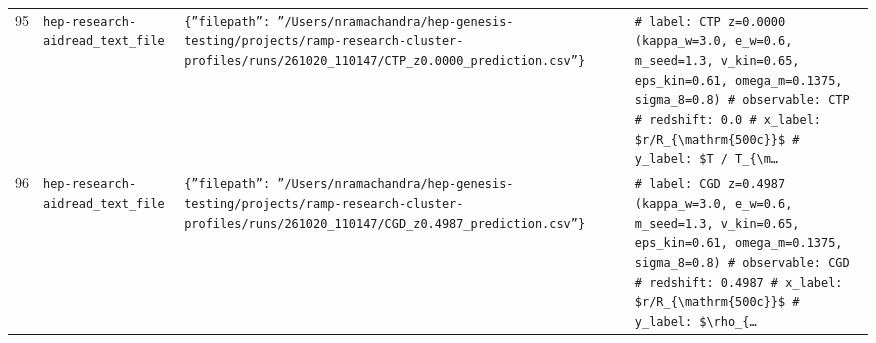 \documentclass[11pt,a4paper]{article}
\begin{document}
\begin{longtable}{@{}p{}p{}p{}p{}@{}}
95 & \texttt{hep-research-aid}\newline\texttt{read\_\allowbreak{}text\_\allowbreak{}file} & \texttt{\{''filepath'':\allowbreak{} ''/\allowbreak{}Users/\allowbreak{}nramachandra/\allowbreak{}hep-genesis-testing/\allowbreak{}projects/\allowbreak{}ramp-research-cluster-profiles/\allowbreak{}runs/\allowbreak{}261020\_\allowbreak{}110147/\allowbreak{}CTP\_\allowbreak{}z0.0000\_\allowbreak{}prediction.csv''\}\allowbreak{}} & \texttt{\# label:\allowbreak{} CTP z=\allowbreak{}0.0000 (kappa\_\allowbreak{}w=\allowbreak{}3.0,\allowbreak{} e\_\allowbreak{}w=\allowbreak{}0.6,\allowbreak{} m\_\allowbreak{}seed=\allowbreak{}1.3,\allowbreak{} v\_\allowbreak{}kin=\allowbreak{}0.65,\allowbreak{} eps\_\allowbreak{}kin=\allowbreak{}0.61,\allowbreak{} omega\_\allowbreak{}m=\allowbreak{}0.1375,\allowbreak{} sigma\_\allowbreak{}8=\allowbreak{}0.8)\allowbreak{} \# observable:\allowbreak{} CTP \# redshift:\allowbreak{} 0.0 \# x\_\allowbreak{}label:\allowbreak{} \$r/\allowbreak{}R\_\allowbreak{}\{\textbackslash{}\allowbreak{}mathrm\{500c\}\allowbreak{}\}\allowbreak{}\$ \# y\_\allowbreak{}label:\allowbreak{} \$T /\allowbreak{} T\_\allowbreak{}\{\textbackslash{}\allowbreak{}m\ldots{}\allowbreak{}} \\
96 & \texttt{hep-research-aid}\newline\texttt{read\_\allowbreak{}text\_\allowbreak{}file} & \texttt{\{''filepath'':\allowbreak{} ''/\allowbreak{}Users/\allowbreak{}nramachandra/\allowbreak{}hep-genesis-testing/\allowbreak{}projects/\allowbreak{}ramp-research-cluster-profiles/\allowbreak{}runs/\allowbreak{}261020\_\allowbreak{}110147/\allowbreak{}CGD\_\allowbreak{}z0.4987\_\allowbreak{}prediction.csv''\}\allowbreak{}} & \texttt{\# label:\allowbreak{} CGD z=\allowbreak{}0.4987 (kappa\_\allowbreak{}w=\allowbreak{}3.0,\allowbreak{} e\_\allowbreak{}w=\allowbreak{}0.6,\allowbreak{} m\_\allowbreak{}seed=\allowbreak{}1.3,\allowbreak{} v\_\allowbreak{}kin=\allowbreak{}0.65,\allowbreak{} eps\_\allowbreak{}kin=\allowbreak{}0.61,\allowbreak{} omega\_\allowbreak{}m=\allowbreak{}0.1375,\allowbreak{} sigma\_\allowbreak{}8=\allowbreak{}0.8)\allowbreak{} \# observable:\allowbreak{} CGD \# redshift:\allowbreak{} 0.4987 \# x\_\allowbreak{}label:\allowbreak{} \$r/\allowbreak{}R\_\allowbreak{}\{\textbackslash{}\allowbreak{}mathrm\{500c\}\allowbreak{}\}\allowbreak{}\$ \# y\_\allowbreak{}label:\allowbreak{} \$\textbackslash{}\allowbreak{}rho\_\allowbreak{}\{\ldots{}\allowbreak{}} \\

\end{longtable}
\end{document}

